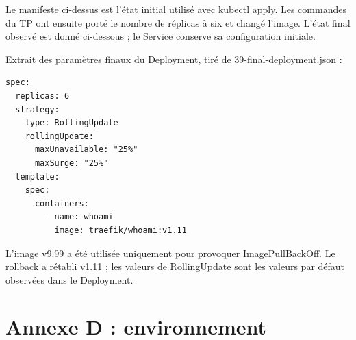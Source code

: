 \documentclass[11pt,a4paper]{article}
\begin{document}
Le manifeste ci-dessus est l'état initial utilisé avec kubectl apply. Les commandes du TP ont ensuite porté le nombre de réplicas à six et changé l'image. L'état final observé est donné ci-dessous ; le Service conserve sa configuration initiale.

\par\medskip\noindent\begin{minipage}{\linewidth}
Extrait des paramètres finaux du Deployment, tiré de 39-final-deployment.json :

\par\vspace{4pt}\noindent\begin{minipage}{\linewidth}
\begin{Verbatim}[breaklines=true,breakanywhere=true,fontsize=\footnotesize,frame=single,framesep=8pt,rulecolor=\color{teal}]
spec:
  replicas: 6
  strategy:
    type: RollingUpdate
    rollingUpdate:
      maxUnavailable: "25%"
      maxSurge: "25%"
  template:
    spec:
      containers:
        - name: whoami
          image: traefik/whoami:v1.11
\end{Verbatim}
\end{minipage}\par\vspace{6pt}

L'image v9.99 a été utilisée uniquement pour provoquer ImagePullBackOff. Le rollback a rétabli v1.11 ; les valeurs de RollingUpdate sont les valeurs par défaut observées dans le Deployment.
\end{minipage}\par\medskip

\section*{Annexe D : environnement}
\end{document}
